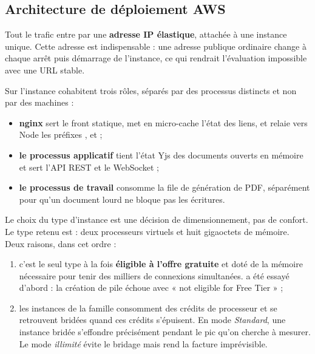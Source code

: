\subsection{Architecture de déploiement AWS}

Tout le trafic entre par une \textbf{adresse IP élastique}, attachée à une
instance unique. Cette adresse est indispensable : une adresse publique
ordinaire change à chaque arrêt puis démarrage de l'instance, ce qui rendrait
l'évaluation impossible avec une URL stable.

Sur l'instance cohabitent trois rôles, séparés par des processus distincts et
non par des machines :

\begin{itemize}[leftmargin=1.4em,itemsep=2pt]
  \item \textbf{nginx} sert le front statique, met en micro-cache l'état des
        liens, et relaie vers Node les préfixes ,  et
         ;
  \item \textbf{le processus applicatif} tient l'état Yjs des documents ouverts
        en mémoire et sert l'API REST et le WebSocket ;
  \item \textbf{le processus de travail} consomme la file de génération de PDF,
        séparément pour qu'un document lourd ne bloque pas les écritures.
\end{itemize}


Le choix du type d'instance est une décision de dimensionnement, pas de confort.
Le type retenu est  : deux processeurs virtuels et huit
gigaoctets de mémoire. Deux raisons, dans cet ordre :

\begin{enumerate}[leftmargin=1.4em,itemsep=2pt]
  \item c'est le seul type à la fois \textbf{éligible à l'offre gratuite} et doté
        de la mémoire nécessaire pour tenir des milliers de connexions
        simultanées.  a été essayé d'abord : la création de pile
        échoue avec « not eligible for Free Tier » ;
  \item les instances de la famille  consomment des crédits de processeur
        et se retrouvent bridées quand ces crédits s'épuisent. En mode
        \emph{Standard}, une instance bridée s'effondre précisément pendant le
        pic qu'on cherche à mesurer. Le mode \emph{illimité} évite le
        bridage mais rend la facture imprévisible.
\end{enumerate}

